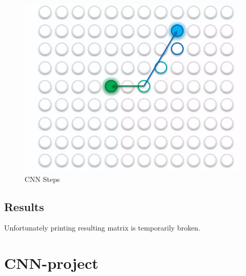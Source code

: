 \documentclass[]{report}
\begin{document}
\begin{figure}[H]
\centering
\includegraphics[scale=0.4]{som-coloring}
\caption{CNN Steps}
\end{figure}
\subsection{Results}
Unfortunately printing resulting matrix is temporarily broken.
\section{CNN-project}
\end{document}
